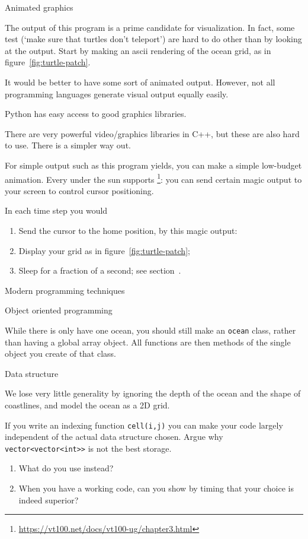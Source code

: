  {Animated graphics}
\label{sec:vt100-animation}

The output of this program is a prime candidate for visualization.
In fact, some test (`make sure that turtles don't teleport')
are hard to do other than by looking at the output.
Start by making an ascii rendering of the ocean grid,
as in figure~\ref{fig:turtle-patch}.

It would be better to have some sort of animated output.
However, not all programming languages generate visual
output equally easily.
\begin{python}
  Python has easy access to good graphics libraries.
\end{python}
\begin{cxx}
  There are very powerful video/graphics libraries in C++,
  but these are also hard to use.
  There is a simpler way out.
\end{cxx}

For simple output such as this program yields,
you can make a simple low-budget animation.
Every  under the sun
supports 
\footnote{\url{https://vt100.net/docs/vt100-ug/chapter3.html}}:
you can send certain magic output to your screen to
control cursor positioning.

In each time step you would
\begin{enumerate}
\item Send the cursor to the home position, by this magic output:
\item Display your grid as in figure~\ref{fig:turtle-patch};
\item Sleep for a fraction of a second;
  see section~.
\end{enumerate}

 {Modern programming techniques}

 {Object oriented programming}

While there is only have one ocean, you should still
make an \lstinline{ocean} class, rather than
having a global array object.
All functions are then methods of the single object you create of that class.

 {Data structure}
\label{sec:turtle-grid}

We lose very little generality by ignoring the depth of the ocean
and the shape of coastlines,
and model the ocean as a 2D grid.

If you write an indexing function \lstinline{cell(i,j)}
you can make your code largely independent of the actual data structure chosen.
Argue why \lstinline+vector<vector<int>>+ is not the best storage.
\begin{enumerate}
\item What do you use instead?
\item When you have a working code, can you show by timing that
  your choice is indeed superior?
\end{enumerate}

